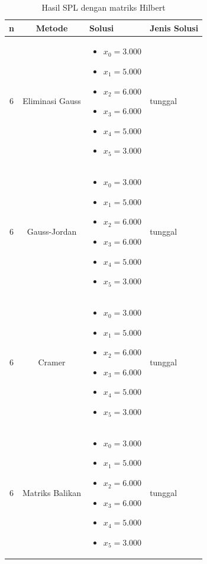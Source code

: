 \documentclass[12pt,a4paper]{report}
\begin{document}
\begin{table}[H]
    \centering
    \caption{Hasil SPL dengan matriks Hilbert}
    \begin{tabular}{|c|c|p{5cm}|l|}
        \hline
        \textbf{n} & \textbf{Metode} & \textbf{Solusi} & \textbf{Jenis Solusi} \\
        \hline
        6 & Eliminasi Gauss & 
        \begin{itemize}
            \item $x_0 = 3.000$
            \item $x_1 = 5.000$
            \item $x_2 = 6.000$
            \item $x_3 = 6.000$
            \item $x_4 = 5.000$
            \item $x_5 = 3.000$
        \end{itemize}
        & tunggal\\
        \hline
        6 & Gauss-Jordan & 
        \begin{itemize}
            \item $x_0 = 3.000$
            \item $x_1 = 5.000$
            \item $x_2 = 6.000$
            \item $x_3 = 6.000$
            \item $x_4 = 5.000$
            \item $x_5 = 3.000$
        \end{itemize}
        & tunggal\\
        \hline
        6 & Cramer & 
        \begin{itemize}
            \item $x_0 = 3.000$
            \item $x_1 = 5.000$
            \item $x_2 = 6.000$
            \item $x_3 = 6.000$
            \item $x_4 = 5.000$
            \item $x_5 = 3.000$
        \end{itemize}
        & tunggal\\
        \hline
        6 & Matriks Balikan & 
        \begin{itemize}
            \item $x_0 = 3.000$
            \item $x_1 = 5.000$
            \item $x_2 = 6.000$
            \item $x_3 = 6.000$
            \item $x_4 = 5.000$
            \item $x_5 = 3.000$
        \end{itemize}
        & tunggal\\
        \hline
        \end{tabular}
\end{table}
\end{document}
